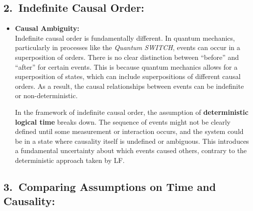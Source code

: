 \subsection*{2.\ Indefinite Causal Order:}

\begin{itemize}[leftmargin=1.5em]
\item \textbf{Causal Ambiguity:}\\
  Indefinite causal order is fundamentally different. In quantum mechanics, particularly in processes like the \emph{Quantum SWITCH}, events can occur in a superposition of orders. There is no clear distinction between ``before'' and ``after'' for certain events. This is because quantum mechanics allows for a superposition of states, which can include superpositions of different causal orders. As a result, the causal relationships between events can be indefinite or non-deterministic.

  In the framework of indefinite causal order, the assumption of \textbf{deterministic logical time} breaks down. The sequence of events might not be clearly defined until some measurement or interaction occurs, and the system could be in a state where causality itself is undefined or ambiguous. This introduces a fundamental uncertainty about which events caused others, contrary to the deterministic approach taken by LF.
\end{itemize}

\subsection*{3.\ Comparing Assumptions on Time and Causality:}

